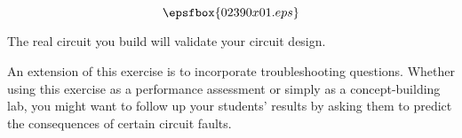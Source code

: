

$$\epsfbox{02390x01.eps}$$

\vfil \eject






The real circuit you build will validate your circuit design.







An extension of this exercise is to incorporate troubleshooting questions.  Whether using this exercise as a performance assessment or simply as a concept-building lab, you might want to follow up your students' results by asking them to predict the consequences of certain circuit faults.




